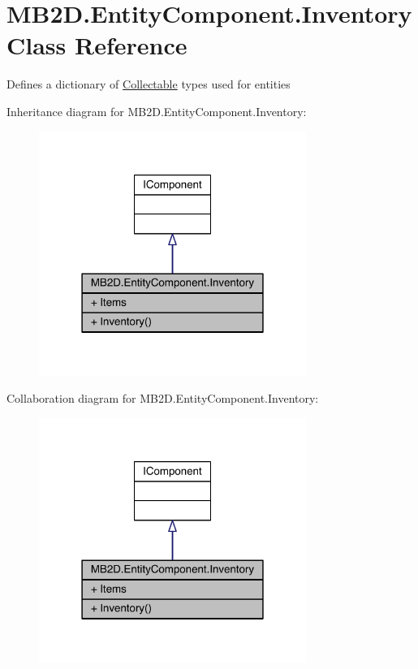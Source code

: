 \hypertarget{class_m_b2_d_1_1_entity_component_1_1_inventory}{}\section{M\+B2\+D.\+Entity\+Component.\+Inventory Class Reference}
\label{class_m_b2_d_1_1_entity_component_1_1_inventory}


Defines a dictionary of \hyperlink{class_m_b2_d_1_1_collectable}{Collectable} types used for entities  




Inheritance diagram for M\+B2\+D.\+Entity\+Component.\+Inventory\+:
\nopagebreak
\begin{figure}[H]
\begin{center}
\leavevmode
\includegraphics[width=247pt]{class_m_b2_d_1_1_entity_component_1_1_inventory__inherit__graph}
\end{center}
\end{figure}


Collaboration diagram for M\+B2\+D.\+Entity\+Component.\+Inventory\+:
\nopagebreak
\begin{figure}[H]
\begin{center}
\leavevmode
\includegraphics[width=247pt]{class_m_b2_d_1_1_entity_component_1_1_inventory__coll__graph}
\end{center}
\end{figure}
